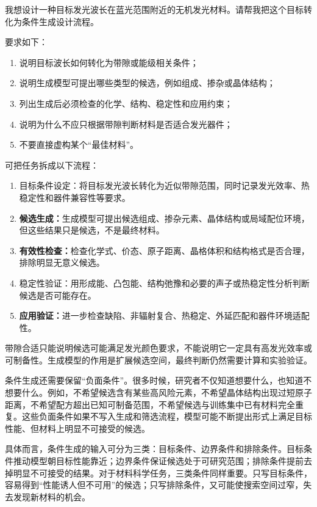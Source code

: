 \begin{samepage}
\begin{userbox}
我想设计一种目标发光波长在蓝光范围附近的无机发光材料。请帮我把这个目标转化为条件生成设计流程。

要求如下：
\begin{enumerate}
\item 说明目标波长如何转化为带隙或能级相关条件；
\item 说明生成模型可提出哪些类型的候选，例如组成、掺杂或晶体结构；
\item 列出生成后必须检查的化学、结构、稳定性和应用约束；
\item 说明为什么不应只根据带隙判断材料是否适合发光器件；
\item 不要直接虚构某个“最佳材料”。
\end{enumerate}
\end{userbox}

\begin{aibox}
可把任务拆成以下流程：

\begin{enumerate}
\item 目标条件设定：将目标发光波长转化为近似带隙范围，同时记录发光效率、热稳定性和器件兼容性等要求。
\item \textbf{候选生成：}生成模型可提出候选组成、掺杂元素、晶体结构或局域配位环境，但这些结果只是候选，不是最终材料。
\item \textbf{有效性检查：}检查化学式、价态、原子距离、晶格体积和结构格式是否合理，排除明显无意义候选。
\item 稳定性验证：用形成能、凸包能、结构弛豫和必要的声子或热稳定性分析判断候选是否可能存在。
\item \textbf{应用验证：}进一步检查缺陷、非辐射复合、热稳定、外延匹配和器件环境适配性。
\end{enumerate}

带隙合适只能说明候选可能满足发光颜色要求，不能说明它一定具有高发光效率或可制备性。生成模型的作用是扩展候选空间，最终判断仍然需要计算和实验验证。
\end{aibox}
\end{samepage}

条件生成还需要保留“负面条件”。很多时候，研究者不仅知道想要什么，也知道不想要什么。例如，不希望候选含有某些高风险元素，不希望晶体结构出现过短原子距离，不希望配方超出已知可制备范围，不希望候选与训练集中已有材料完全重复。这些负面条件如果不写入生成和筛选流程，模型可能不断提出形式上满足目标性能、但材料上明显不可接受的候选。

具体而言，条件生成的输入可分为三类：目标条件、边界条件和排除条件。目标条件推动模型朝目标性能靠近；边界条件保证候选处于可研究范围；排除条件提前去掉明显不可接受的结果。对于材料科学任务，三类条件同样重要。只写目标条件，容易得到“性能诱人但不可用”的候选；只写排除条件，又可能使搜索空间过窄，失去发现新材料的机会。


